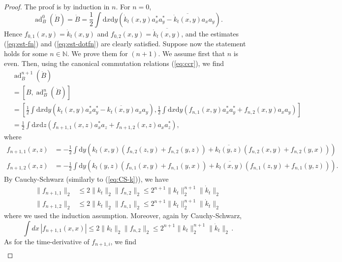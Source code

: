 \documentclass[11pt,a4paper]{article}
\newcommand{\bN}{{\mathbb N}}
\newcommand{\ad}{\operatorname{ad}}	%
\newcommand{\di}{\textrm{d}}		%
\newcommand{\cc}[1]{\overline{#1}}	%
\newcommand{\norm}[1]{\lVert#1\rVert}	%
\newcommand{\be}[1]{\begin{equation}\label{eq:#1}}	%
\newcommand{\bd}{\begin{displaymath}}			%
\newcommand{\ed}{\end{displaymath}}
\begin{document}
\begin{proof} The proof is by induction in $n$. For $n = 0$,
\bd
\ad^0_B(\dot B) = \dot B = \frac{1}{2}\int \di x\di y\left( \dot k_t (x,y) a^\ast_x a^\ast_y - \cc{\dot k_t (x,y)} a_x a_y \right).
\ed
Hence $f_{0,1} (x,y) = \dot{k}_t (x,y)$ and $f_{0,2} (x,y) = \cc{\dot{k}_t (x,y)}$, and the estimates (\ref{eq:est-fn}) and (\ref{eq:est-dotfn}) are clearly satisfied. Suppose now the statement holds for some $n \in \bN$. 
We prove them for $(n+1)$. We assume first that $n$ is even. Then, using the canonical commutation relations (\ref{eq:ccr}), we find
\begin{align*}
& \ad^{n+1}_B(\dot B) \\ & = [B,\ad^n_B(\dot B)] \\
& = \left[\frac{1}{2} \int \di x\di y\left( k_t (x,y)a^\ast_x a^\ast_y - \cc{k_t (x,y)}a_x a_y \right), \frac{1}{2}\int \di x\di y\left( f_{n,1}(x,y) a^\ast_x a^\ast_y + f_{n,2}(x,y) a_x a_y \right)\right] \\
& = \frac{1}{2} \int \di x\di z \left(f_{n+1,1}(x,z) a^\ast_x a_z + f_{n+1,2}(x,z) a_x a^\ast_z \right),
\end{align*}
where
\begin{equation}
\label{eq:even}
\begin{split}
f_{n+1,1}(x,z) & = -\frac{1}{2} \int \di y \left( k_t (x,y) \left( f_{n,2}(z,y) + f_{n,2}(y,z) \right) + \cc{k_t (y,z)}\left( f_{n,2}(x,y) + f_{n,2}(y,x)\right) \right)\\
f_{n+1,2}(x,z) & = -\frac{1}{2} \int \di y \left( k_t (y,z) \left( f_{n,1}(x,y) + f_{n,1}(y,x) \right) + \cc{k_t (x,y)}\left( f_{n,1}(z,y) + f_{n,1}(y,z)\right) \right) .
\end{split}
\end{equation}
By Cauchy-Schwarz (similarly to (\ref{eq:CS-k})), we have
\be{normnorm}
\begin{split}
\norm{f_{n+1,1}}_{2} & \leq 2 \| k_t  \|_2 \| f_{n,2} \|_2 \leq 2^{n+1} \| k_t \|^{n+1}_2 \| \dot k_t \|_2 \\
\| f_{n+1 ,2} \|_2 & \leq 2 \| k_t \|_2 \| f_{n,1} \|_2 \leq 2^{n+1} \| k_t \|^{n+1}_2 \| \dot k_t \|_2
\end{split} 
\end{equation}
where we used the induction assumption. Moreover, again by Cauchy-Schwarz,
\[ \int dx \, |f_{n+1 ,1} (x,x)|  \leq 2 \| k_t \|_2 \| f_{n,2} \|_2 \leq 2^{n+1} \| k_t \|^{n+1}_2 \| \dot k_t \|_2 \,. \]
As for the time-derivative of $f_{n+1,i}$, we find
\[ \begin{split}

\end{split}\]
\end{proof}
\end{document}

